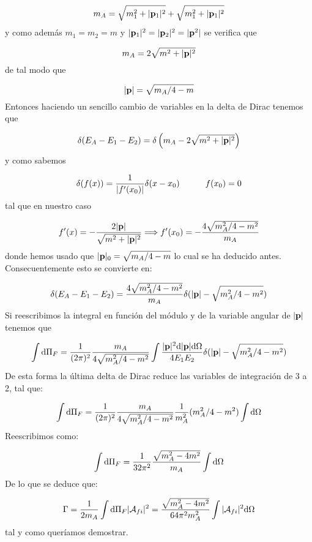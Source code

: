 \begin{solucion}
	\begin{equation*}
		m_A =\sqrt{m_1^2 + |\mathbf{p}_1|^2 }+\sqrt{m_1^2 + |\mathbf{p}_1|^2 }
	\end{equation*}
	y como además $m_1=m_2=m$ y $|\mathbf{p}_1|^2=|\mathbf{p}_2|^2=|\mathbf{p}^2|$ se verifica que
	
	\begin{equation*}
		m_A =2\sqrt{m^2 + |\mathbf{p}|^2 }
	\end{equation*}
	de tal modo que
	
	\begin{equation*}
		|\mathbf{p}| = \sqrt{m_A/4-m}
	\end{equation*}	
	Entonces haciendo un sencillo cambio de variables en la delta de Dirac tenemos que 
	
	\begin{equation*}
		\delta (E_A - E_1 - E_2) = \delta \left( m_A -2\sqrt{m^2 + |\mathbf{p}|^2 } \right)
	\end{equation*}
	y como sabemos 
	
	\begin{equation*}
		\delta (f(x)) = \frac{1}{|f'(x_0)|} \delta (x-x_0) \quad \quad \quad f(x_0)=0
	\end{equation*}
	tal que en nuestro caso
	
	\begin{equation*}
		f'(x) = -\frac{2|\mathbf{p}|}{\sqrt{m^2+|\mathbf{p}|^2}} \Longrightarrow f'(x_0) =- \frac{4\sqrt{m_A^2/4-m^2}}{m_A}
	\end{equation*}
	donde hemos usado que $	|\mathbf{p}|_0 = \sqrt{m_A/4-m}$ lo cual se ha deducido antes. Consecuentemente esto se convierte en:
	
	\begin{equation*}
		\delta (E_A - E_1 - E_2) = \frac{4\sqrt{m_A^2/4-m^2}}{m_A} \delta(|\mathbf{p}|- \sqrt{m_A^2/4-m^2})
	\end{equation*}
	Si reescribimos la integral en función del módulo y de la variable angular de $|\mathbf{p}|$ tenemos que
	
	\begin{equation*}
		\int \mathrm{d} \Pi_F = \frac{1}{(2\pi)^2}\frac{m_A}{4\sqrt{m_A^2/4-m^2}} \int  \frac{|\mathbf{p}|^2 \mathrm{d} |\mathbf{p}| \mathrm{d} \Omega}{4E_1E_2}  \delta(|\mathbf{p}|- \sqrt{m_A^2/4-m^2})
	\end{equation*}
	De esta forma la última delta de Dirac reduce las variables de integración de 3 a 2, tal que:
	
	\begin{equation*}
		\int \mathrm{d} \Pi_F = \frac{1}{(2\pi)^2}\frac{m_A}{4\sqrt{m_A^2/4-m^2}} \frac{1}{m_A^2}  
		(m_A^2/4 - m^2)	\int \mathrm{d} \Omega
	\end{equation*}
	Reescribimos como:
	
	\begin{equation*}
		\int \mathrm{d} \Pi_F = \frac{1}{32 \pi^2 } \frac{\sqrt{m_A^2-4m^2}}{m_A} \int \mathrm{d} \Omega
	\end{equation*}
	De lo que se deduce que:
	
	\begin{equation*}
		\Gamma = \frac{1}{2m_A} \int \mathrm{d} \Pi_F |\mathcal{A}_{fi}|^2 = \frac{\sqrt{m_A^2-4m^2}}{64\pi^2 m_A^2} \int |\mathcal{A}_{fi}|^2 \mathrm{d} \Omega
	\end{equation*}
	tal y como queríamos demostrar.
\end{solucion}


